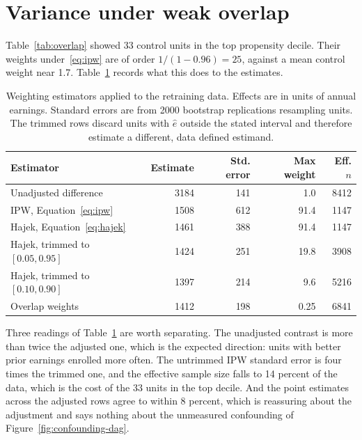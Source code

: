 \section{Variance under weak overlap}
\label{sec:ps-variance}

Table~\ref{tab:overlap} showed 33 control units in the top propensity decile.
Their weights under~\eqref{eq:ipw} are of order $1/(1 - 0.96) = 25$, against a
mean control weight near 1.7. Table~\ref{tab:weighting-comparison} records what
this does to the estimates.

\begin{table}[t]
\centering
\caption[Weighting estimators on the retraining data]{Weighting estimators
applied to the retraining data. Effects are in units of annual earnings.
Standard errors are from 2000 bootstrap replications resampling units. The
trimmed rows discard units with $\hat{e}$ outside the stated interval and
therefore estimate a different, data defined estimand.}
\label{tab:weighting-comparison}
\begin{tabular}{lrrrr}
\toprule
Estimator & Estimate & Std. error & Max weight & Eff. $n$ \\
\midrule
Unadjusted difference        & 3184 & 141 & 1.0  & 8412 \\
IPW, Equation~\eqref{eq:ipw} & 1508 & 612 & 91.4 & 1147 \\
Hajek, Equation~\eqref{eq:hajek} & 1461 & 388 & 91.4 & 1147 \\
Hajek, trimmed to $[0.05, 0.95]$ & 1424 & 251 & 19.8 & 3908 \\
Hajek, trimmed to $[0.10, 0.90]$ & 1397 & 214 &  9.6 & 5216 \\
Overlap weights              & 1412 & 198 &  0.25 & 6841 \\
\bottomrule
\end{tabular}
\end{table}

Three readings of Table~\ref{tab:weighting-comparison} are worth separating. The
unadjusted contrast is more than twice the adjusted one, which is the expected
direction: units with better prior earnings enrolled more often. The untrimmed
IPW standard error is four times the trimmed one, and the effective sample size
falls to 14 percent of the data, which is the cost of the 33 units in the top
decile. And the point estimates across the adjusted rows agree to within 8
percent, which is reassuring about the adjustment and says nothing about the
unmeasured confounding of Figure~\ref{fig:confounding-dag}.

